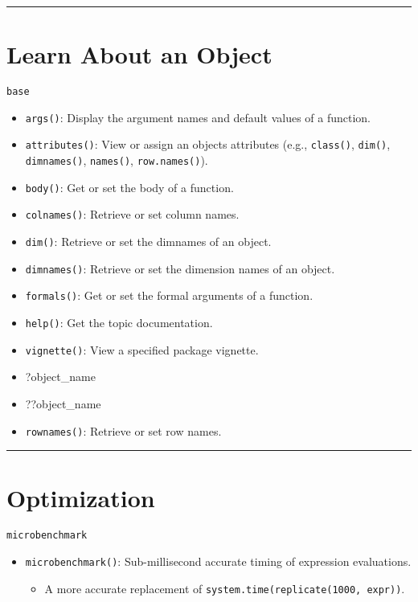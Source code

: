\documentclass[]{book}
\providecommand{\tightlist}{%
  \setlength{\itemsep}{0pt}\setlength{\parskip}{0pt}}
\theoremstyle{definition}
\theoremstyle{definition}
\theoremstyle{definition}
\theoremstyle{remark}
\begin{document}
\begin{center}\rule{0.5\linewidth}{\linethickness}\end{center}

\section{Learn About an Object}\label{learn-about-an-object}

\texttt{base}

\begin{itemize}
\tightlist
\item
  \texttt{args()}: Display the argument names and default values of a
  function.
\item
  \texttt{attributes()}: View or assign an objects attributes (e.g.,
  \texttt{class()}, \texttt{dim()}, \texttt{dimnames()},
  \texttt{names()}, \texttt{row.names()}).
\item
  \texttt{body()}: Get or set the body of a function.
\item
  \texttt{colnames()}: Retrieve or set column names.
\item
  \texttt{dim()}: Retrieve or set the dimnames of an object.
\item
  \texttt{dimnames()}: Retrieve or set the dimension names of an object.
\item
  \texttt{formals()}: Get or set the formal arguments of a function.
\item
  \texttt{help()}: Get the topic documentation.
\item
  \texttt{vignette()}: View a specified package vignette.
\item
  ?object\_name
\item
  ??object\_name
\item
  \texttt{rownames()}: Retrieve or set row names.
\end{itemize}

\begin{center}\rule{0.5\linewidth}{\linethickness}\end{center}

\section{Optimization}\label{optimization}

\texttt{microbenchmark}

\begin{itemize}
\tightlist
\item
  \texttt{microbenchmark()}: Sub-millisecond accurate timing of
  expression evaluations.

  \begin{itemize}
  \tightlist
  \item
    A more accurate replacement of
    \texttt{system.time(replicate(1000,\ expr))}.
  \end{itemize}
\end{itemize}
\end{document}
